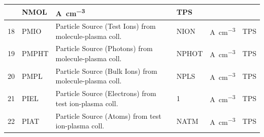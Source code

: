 \begin{landscape}
\begin{longtable}{|r|l|l|l|l|c|}
                                                                   & NMOL
                                                                   &
    \si{\ampere\per\cubic\centi\metre}                             & TPS
    \\  \hline
    18                                                             & PMIO
                                                                   & Particle Source (Test
    Ions) from molecule-plasma coll.
                                                                   & NION
                                                                   &
    \si{\ampere\per\cubic\centi\metre}                             & TPS
    \\	\hline
    19                                                             & PMPHT
                                                                   & Particle Source (Photons)
    from molecule-plasma coll.
                                                                   & NPHOT
                                                                   &
    \si{\ampere\per\cubic\centi\metre}                             & TPS
    \\	\hline
    20                                                             & PMPL
                                                                   & Particle Source (Bulk
    Ions) from molecule-plasma coll.
                                                                   & NPLS
                                                                   &
    \si{\ampere\per\cubic\centi\metre}                             & TPS
    \\	 \hline
    21                                                             & PIEL
                                                                   & Particle Source
    (Electrons) from test ion-plasma coll.
                                                                   & 1
                                                                   &
    \si{\ampere\per\cubic\centi\metre}                             & TPS
    \\	\hline
    22                                                             & PIAT
                                                                   & Particle Source (Atoms)
    from test ion-plasma coll.
                                                                   & NATM
                                                                   &
    \si{\ampere\per\cubic\centi\metre}                             & TPS
    \\  \hline

\end{longtable}
\end{landscape}

